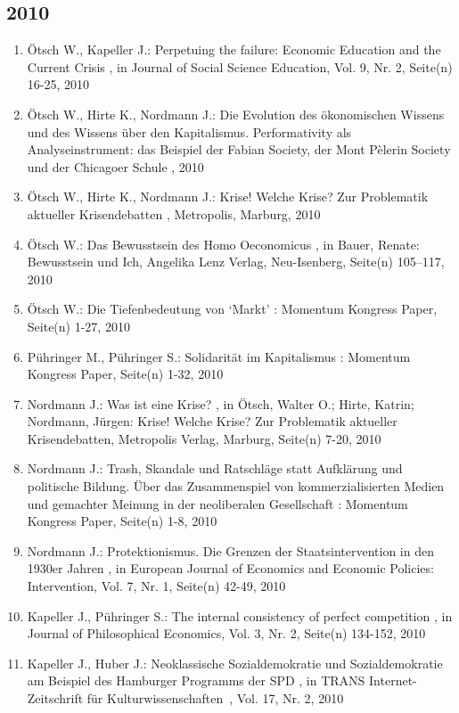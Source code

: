  \subsection*{2010} 
 \begin{enumerate}[leftmargin=*, labelsep=0.5cm] 
	 \item Ötsch W., Kapeller J.:  Perpetuing the failure: Economic Education and the Current Crisis  , in Journal of Social Science Education, Vol. 9, Nr. 2, Seite(n) 16-25, 2010
	 \item Ötsch W., Hirte K., Nordmann J.:  Die Evolution des ökonomischen Wissens und des Wissens über den Kapitalismus. Performativity als Analyseinstrument: das Beispiel der Fabian Society, der Mont Pèlerin Society und der Chicagoer Schule  , 2010
	 \item Ötsch W., Hirte K., Nordmann J.:  Krise! Welche Krise? Zur Problematik aktueller Krisendebatten  , Metropolis, Marburg, 2010
	 \item Ötsch W.:  Das Bewusstsein des Homo Oeconomicus  , in Bauer, Renate: Bewusstsein und Ich, Angelika Lenz Verlag, Neu-Isenberg, Seite(n) 105–117, 2010
	 \item Ötsch W.:  Die Tiefenbedeutung von ‘Markt’  : Momentum Kongress Paper, Seite(n) 1-27, 2010
	 \item Pühringer M., Pühringer S.:  Solidarität im Kapitalismus  : Momentum Kongress Paper, Seite(n) 1-32, 2010
	 \item Nordmann J.:  Was ist eine Krise?  , in Ötsch, Walter O.; Hirte, Katrin; Nordmann, Jürgen: Krise! Welche Krise? Zur Problematik aktueller Krisendebatten, Metropolis Verlag, Marburg, Seite(n) 7-20, 2010
	 \item Nordmann J.:  Trash, Skandale und Ratschläge statt Aufklärung und politische Bildung. Über das Zusammenspiel von kommerzialisierten Medien und gemachter Meinung in der neoliberalen Gesellschaft  : Momentum Kongress Paper, Seite(n) 1-8, 2010
	 \item Nordmann J.:  Protektionismus. Die Grenzen der Staatsintervention in den 1930er Jahren  , in European Journal of Economics and Economic Policies: Intervention, Vol. 7, Nr. 1, Seite(n) 42-49, 2010
	 \item Kapeller J., Pühringer S.:  The internal consistency of perfect competition  , in Journal of Philosophical Economics, Vol. 3, Nr. 2, Seite(n) 134-152, 2010
	 \item Kapeller J., Huber J.:  Neoklassische Sozialdemokratie und Sozialdemokratie am Beispiel des Hamburger Programms der SPD  , in TRANS Internet-Zeitschrift für Kulturwissenschaften , Vol. 17, Nr. 2, 2010

\end{enumerate}
